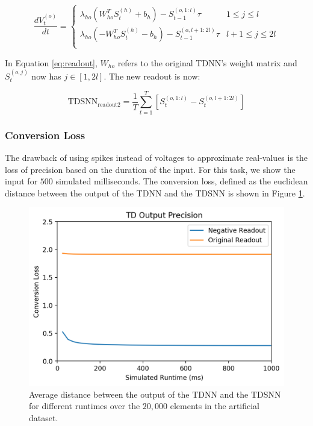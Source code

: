 \documentclass{article}
\begin{document}
\begin{equation}
    \frac{dV^{\left(o\right)}_t}{dt} = 
    \begin{cases} \lambda_{ho} \left(W_{ho}^TS^{\left(h\right)}_{t} + b_h\right) - S^{\left(o,1:l\right)}_{t-1} \tau & 1 \leq j \leq l  \\
      \lambda_{ho} \left(-W_{ho}^TS^{\left(h\right)}_{t} - b_h\right) - S^{\left(o,l+1:2l\right)}_{t-1} \tau & l+1 \leq j \leq 2l \\ \end{cases}
    \label{eq:readout}
\end{equation}

In Equation \ref{eq:readout}, $W_{ho}$ refers to the original TDNN's weight matrix and $S^{\left(o,j\right)}_{t}$ now has $j \in [1, 2l]$. The new readout is now:

\begin{equation}
    \text{TDSNN}_{\text{readout2}} = \frac{1}{T} \sum_{t=1}^{T}{\left[S_t^{\left(o,1:l\right)} - S_t^{\left(o,l+1:2l\right)}\right]}
\end{equation}

\subsubsection*{Conversion Loss}
The drawback of using spikes instead of voltages to approximate real-values is the loss of precision based on the duration of the input. For this task, we show the input for $500$ simulated milliseconds. The conversion loss, defined as the euclidean distance between the output of the TDNN and the TDSNN is shown in Figure \ref{fig:clfig}.

\begin{figure}[H]
    \centering
    \includegraphics[width=0.5\linewidth]{../results/conversion-loss.png}
    \caption{Average distance between the output of the TDNN and the TDSNN for different runtimes over the $20,000$ elements in the artificial dataset.}
    \label{fig:clfig}
\end{figure}
\end{document}
